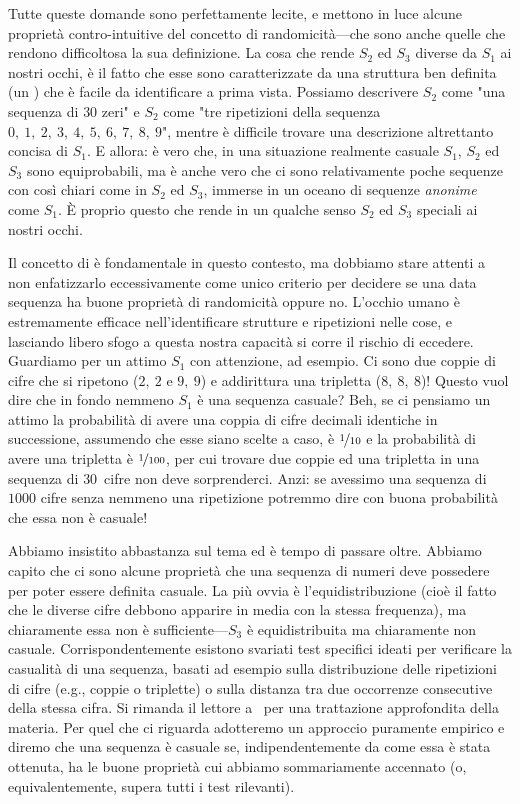 Tutte queste domande sono perfettamente lecite, e mettono in luce alcune
proprietà contro-intuitive del concetto di randomicità---che sono anche
quelle che rendono difficoltosa la sua definizione. La cosa che rende $S_2$ ed
$S_3$ diverse da $S_1$ ai nostri occhi, è il fatto che esse sono
caratterizzate da una struttura ben definita (un ) che è
facile da identificare a prima vista. Possiamo descrivere $S_2$ come
"una sequenza di $30$ zeri" e $S_2$ come "tre ripetizioni della sequenza
$0,~1,~2,~3,~4,~5,~6,~7,~8,~9$", mentre è difficile trovare una descrizione
altrettanto concisa di $S_1$. E allora: è vero che, in una situazione
realmente casuale $S_1$, $S_2$ ed $S_3$ sono equiprobabili, ma è anche vero
che ci sono relativamente poche sequenze con  così chiari come
in $S_2$ ed $S_3$, immerse in un oceano di sequenze \emph{anonime} come $S_1$.
\`E proprio questo che rende in un qualche senso $S_2$ ed $S_3$ speciali ai
nostri occhi.

Il concetto di  è fondamentale in questo contesto, ma dobbiamo
stare attenti a non enfatizzarlo eccessivamente come unico criterio per
decidere se una data sequenza ha buone proprietà di randomicità oppure no.
L'occhio umano è estremamente efficace nell'identificare strutture e
ripetizioni nelle cose, e lasciando libero sfogo a questa nostra capacità si
corre il rischio di eccedere. Guardiamo per un attimo $S_1$ con attenzione, ad
esempio. Ci sono due coppie di cifre che si ripetono ($2,~2$ e $9,~9$) e
addirittura una tripletta ($8,~8,~8$)! Questo vuol dire che in fondo nemmeno
$S_1$ è una sequenza casuale? Beh, se ci pensiamo un attimo la probabilità
di avere una coppia di cifre decimali identiche in successione, assumendo
che esse siano scelte a caso, è $\nicefrac{1}{10}$ e la probabilità di avere
una tripletta è $\nicefrac{1}{100}$, per cui trovare due coppie ed una
tripletta in una sequenza di $30$~cifre non deve sorprenderci. Anzi: se
avessimo una sequenza di $1000$ cifre senza nemmeno una ripetizione potremmo
dire con buona probabilità che essa non è casuale!

Abbiamo insistito abbastanza sul tema ed è tempo di passare oltre. Abbiamo
capito che ci sono alcune proprietà che una sequenza di numeri deve
possedere per poter essere definita casuale. La più ovvia è
l'equidistribuzione (cioè il fatto che le diverse cifre debbono apparire
in media con la stessa frequenza), ma chiaramente essa non è
sufficiente---$S_3$ è equidistribuita ma chiaramente non casuale.
Corrispondentemente esistono svariati test specifici ideati per verificare
la casualità di una sequenza, basati ad esempio sulla distribuzione delle
ripetizioni di cifre (e.g., coppie o triplette) o sulla distanza tra due
occorrenze consecutive della stessa cifra. Si rimanda il lettore a~\cite{taocp2}
per una trattazione approfondita della materia. Per quel che ci riguarda
adotteremo un approccio puramente empirico e diremo che una sequenza è casuale
se, indipendentemente da come essa è stata ottenuta, ha le buone proprietà
cui abbiamo sommariamente accennato (o, equivalentemente, supera tutti i test
rilevanti).


